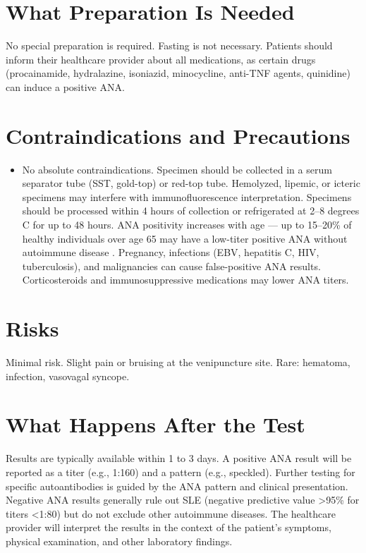 \section*{What Preparation Is Needed}
No special preparation is required. Fasting is not necessary. Patients should inform their healthcare provider about all medications, as certain drugs (procainamide, hydralazine, isoniazid, minocycline, anti-TNF agents, quinidine) can induce a positive ANA.

\section*{Contraindications and Precautions}
\begin{itemize}
  \item No absolute contraindications. Specimen should be collected in a serum separator tube (SST, gold-top) or red-top tube. Hemolyzed, lipemic, or icteric specimens may interfere with immunofluorescence interpretation. Specimens should be processed within 4 hours of collection or refrigerated at 2--8 degrees C for up to 48 hours. ANA positivity increases with age --- up to 15--20\% of healthy individuals over age 65 may have a low-titer positive ANA without autoimmune disease \cite{tan1997range}. Pregnancy, infections (EBV, hepatitis C, HIV, tuberculosis), and malignancies can cause false-positive ANA results. Corticosteroids and immunosuppressive medications may lower ANA titers.
\end{itemize}
\section*{Risks}
Minimal risk. Slight pain or bruising at the venipuncture site. Rare: hematoma, infection, vasovagal syncope.

\section*{What Happens After the Test}
Results are typically available within 1 to 3 days. A positive ANA result will be reported as a titer (e.g., 1:160) and a pattern (e.g., speckled). Further testing for specific autoantibodies is guided by the ANA pattern and clinical presentation. Negative ANA results generally rule out SLE (negative predictive value >95\% for titers <1:80) but do not exclude other autoimmune diseases. The healthcare provider will interpret the results in the context of the patient's symptoms, physical examination, and other laboratory findings.

